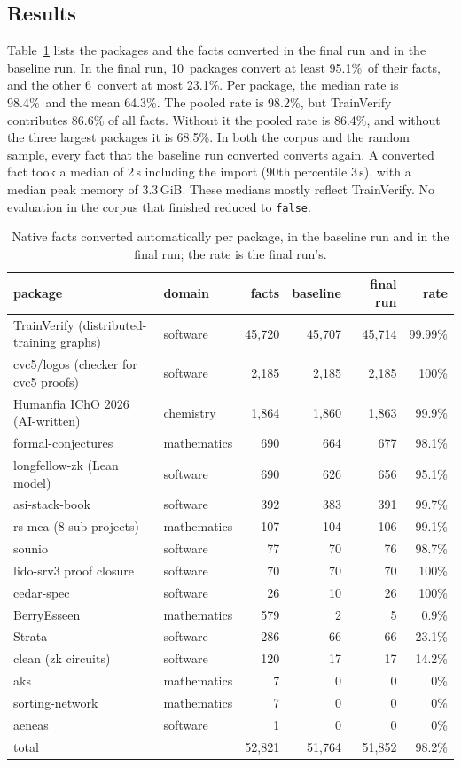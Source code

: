 \documentclass[11pt]{article}
\newcommand{\vtotrate}{98.2\%}   %
\newcommand{\vwoTVrate}{86.4\%}   %
\newcommand{\vwoToprate}{68.5\%}   %
\newcommand{\vmedian}{98.4\%}   %
\newcommand{\vmean}{64.3\%}   %
\newcommand{\vnhi}{10}   %
\newcommand{\vnlo}{6}   %
\newcommand{\vhimin}{95.1\%}   %
\newcommand{\vlomax}{23.1\%}   %
\newcommand{\vconvsecmed}{2}   %
\newcommand{\vconvsecpninety}{3}   %
\newcommand{\vrssmed}{3.3}   %
\begin{document}
\subsection{Results}
Table~\ref{tab:results} lists the packages and the facts converted in the final run and in the baseline run.
In the final run, \vnhi\ packages convert at least \vhimin\ of their facts, and the other \vnlo\ convert at
most \vlomax. Per package, the median rate is \vmedian\ and the mean \vmean. The pooled rate is
\vtotrate, but TrainVerify contributes 86.6\% of all facts. Without it the pooled rate is \vwoTVrate, and
without the three largest packages it is \vwoToprate. In both the corpus and the random sample, every fact
that the baseline run converted converts again. A converted fact took a median of
\vconvsecmed\,s including the import (90th percentile \vconvsecpninety\,s), with a median peak memory of
\vrssmed\,GiB. These medians mostly reflect TrainVerify. No evaluation in the corpus that finished reduced
to \texttt{false}.

\begin{table}[t]\centering\small
\begin{tabular}{llrrrr}\toprule
package & domain & facts & baseline & final run & rate\\\midrule
TrainVerify (distributed-training graphs) & software & 45,720 & 45,707 & 45,714 & 99.99\%\\
cvc5/logos (checker for cvc5 proofs) & software & 2,185 & 2,185 & 2,185 & 100\%\\
Humanfia IChO 2026 (AI-written) & chemistry & 1,864 & 1,860 & 1,863 & 99.9\%\\
formal-conjectures & mathematics & 690 & 664 & 677 & 98.1\%\\
longfellow-zk (Lean model) & software & 690 & 626 & 656 & 95.1\%\\
asi-stack-book & software & 392 & 383 & 391 & 99.7\%\\
rs-mca (8 sub-projects) & mathematics & 107 & 104 & 106 & 99.1\%\\
sounio & software & 77 & 70 & 76 & 98.7\%\\
lido-srv3 proof closure & software & 70 & 70 & 70 & 100\%\\
cedar-spec & software & 26 & 10 & 26 & 100\%\\
\midrule
BerryEsseen & mathematics & 579 & 2 & 5 & 0.9\%\\
Strata & software & 286 & 66 & 66 & 23.1\%\\
clean (zk circuits) & software & 120 & 17 & 17 & 14.2\%\\
aks & mathematics & 7 & 0 & 0 & 0\%\\
sorting-network & mathematics & 7 & 0 & 0 & 0\%\\
aeneas & software & 1 & 0 & 0 & 0\%\\
\midrule
total & & 52,821 & 51,764 & 51,852 & 98.2\%\\\bottomrule
\end{tabular}
\caption{Native facts converted automatically per package, in the baseline run and in the final run; the
rate is the final run's.}\label{tab:results}
\end{table}
\end{document}
